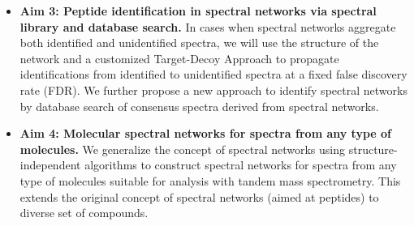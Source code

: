 \documentclass[arial,11pt]{article}
\begin{document}
\begin{itemize}
    \item {\bf Aim 3: Peptide identification in spectral networks via spectral library and database search.} In cases when spectral networks aggregate both identified and unidentified spectra, we will use the structure of the network and a customized Target-Decoy Approach to propagate identifications from identified to unidentified spectra at a fixed false discovery rate (FDR). We further propose a new approach to identify spectral networks by database search of consensus spectra derived from spectral networks.


    \item {\bf Aim 4: Molecular spectral networks for spectra from any type of molecules.} We generalize the concept of spectral networks using structure-independent algorithms to construct spectral networks for spectra from any type of molecules suitable for analysis with tandem mass spectrometry.
This extends the original concept of spectral networks (aimed at peptides) to diverse  set of compounds.
\end{itemize}
\end{document}
